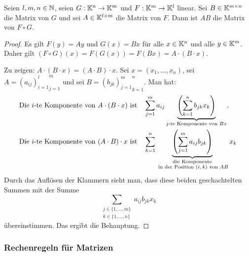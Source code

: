\begin{thm}
	Seien $ l,m,n \in \mathbb N $, seien $ G:\mathbb K^n\to\mathbb K^m $ und $ F:\mathbb K^m\to\mathbb K^l $ linear. Sei $ B \in \mathbb K^{m \times n} $ die Matrix von $ G $ und sei $ A \in \mathbb K^{l \times m} $ die Matrix von $ F $. Dann ist $ AB $ die Matrix von $ F \circ G $.
\end{thm}
\begin{proof}
	Es gilt $ F(y) = Ay $ und $ G(x) = Bx $ für alle $ x \in \mathbb K^n $ und alle $ y \in \mathbb K^m $. Daher gilt $ (F \circ G)(x) = F(G(x)) = F(Bx) = A \cdot (B \cdot x) $.
	
	Zu zeigen: $ A \cdot (B \cdot x) = (A \cdot B) \cdot x $. Sei $ x=(x_1,\ldots,x_n) $, sei $ A = {{(a_{ij})}_{i=1}^l}_{j=1}^m $ und sei $ B = {{(b_{jk})}_{j=1}^m}_{k=1}^n $. Man hat: 
	\begin{align*}
		\text{Die $ i $-te Komponente von $ A \cdot (B \cdot x) $ ist} & & &   \sum\limits_{j=1}^{m}a_{ij}\underbrace{\left( \sum\limits_{k=1}^{n}b_{jk}x_k \right)}_{\text{$ j $-te Komponente von $ Bx $}}, \vspace{3ex}
		\\ 		\text{Die $ i $-te Komponente von $ (A \cdot B) \cdot x $ ist} & & & \sum\limits_{k=1}^{n} \underbrace{\left( \sum\limits_{j=1}^{m}a_{ij}b_{jk} \right)}_{\substack{\text{die Komponente}\\ \text{ in der Position $ (i,k) $ von $ AB $}}} x_k
	\end{align*}
 	Durch das Auflösen der Klammern sieht man, dass diese beiden geschachtelten Summen mit der Summe
	\begin{equation}
		\sum\limits_{\substack{j \in \{1,\ldots,m\} \\ k \in \{1,\ldots,n\}}} a_{ij}b_{jk}x_k
	\end{equation}
	übereinstimmen. Das ergibt die Behauptung.
\end{proof}

%
%			
%		
%			

\subsubsection{Rechenregeln für Matrizen}

